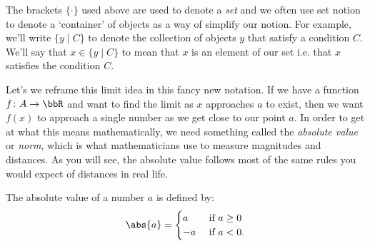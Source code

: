 \begin{rem}
  The brackets $\{\cdot \}$ used above are used to denote a \emph{set} and we often use set notion to denote a `container' of objects as a way of simplify our notion. For example, we'll write $\{y\mid C \}$ to denote the collection of objects $y$ that satisfy a condition $C$. We'll say that $x\in \{y\mid C \}$ to mean that $x$ is an element of our set i.e. that $x$ satisfies the condition $C$. %
\end{rem}
Let's we reframe this limit idea in this fancy new notation.
If we have a function $f\colon A\to \bbR$ and want to find the limit as $x$ approaches $a$ to exist, then we want $f(x)$ to approach a single number as we get close to our point $a$. In order to get at what this means mathematically, we need something called the \emph{absolute value} or \emph{norm}, which is what mathematicians use to measure magnitudes and distances. As you will see, the absolute value follows most of the same rules you would expect of distances in real life.

\begin{defn}
The absolute value of a number $a$ is defined by:
\begin{equation}
	\abs{a}=\begin{cases}
		a &\ \text{if}\ a\geq 0\\
		-a &\ \text{if}\ a<0.
\end{cases}
\end{equation}
\end{defn}

